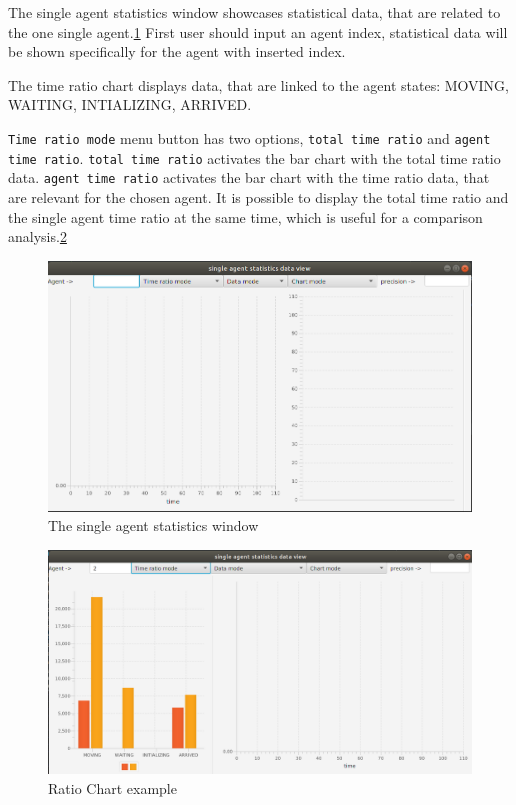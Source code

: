 \documentclass[thesis=B,english]{FITthesis}[2019/12/23]
\begin{document}
The single agent statistics window showcases statistical data, that are related to the one single agent.\ref{fig:float19} First user should input an agent index, statistical data will be shown specifically for the agent with inserted index.

The time ratio chart displays data, that are linked to the agent states: MOVING, WAITING, INTIALIZING, ARRIVED. 

\verb|Time ratio mode| menu button has two options, \verb|total time ratio| and \verb|agent time ratio|. \verb|total time ratio| activates the bar chart with the total time ratio data. \verb|agent time ratio| activates the bar chart with the time ratio data, that are relevant for the chosen agent. It is possible to display the total time ratio and the single agent time ratio at the same time, which is useful for a comparison analysis.\ref{fig:float20}

\begin{figure}
	\includegraphics[scale=0.34]{SingleAgentStatistics.png}
	\caption[Single Agent Statistics]{The single agent statistics window}\label{fig:float19}
\end{figure}

\begin{figure}
	\includegraphics[scale=0.34]{ratiochart.png}
	\caption[Ratio Chart example]{Ratio Chart example}\label{fig:float20}
\end{figure}
\end{document}
